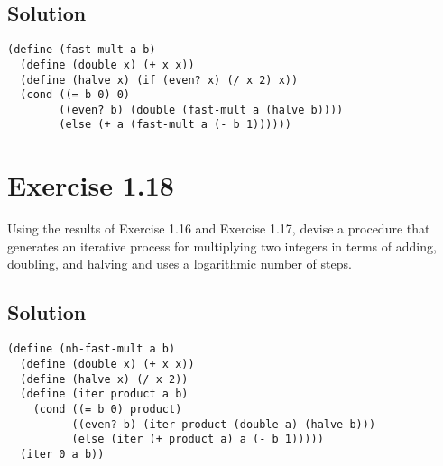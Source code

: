 \documentclass[11pt]{article}
\begin{document}
\subsection{Solution}
\label{sec:org00f66ef}
\begin{verbatim}
(define (fast-mult a b)
  (define (double x) (+ x x))
  (define (halve x) (if (even? x) (/ x 2) x))
  (cond ((= b 0) 0)
        ((even? b) (double (fast-mult a (halve b))))
        (else (+ a (fast-mult a (- b 1))))))
\end{verbatim}
\section{Exercise 1.18}
\label{sec:org6dd7235}
Using the results of Exercise 1.16 and Exercise 1.17, devise a procedure
that generates an iterative process for multiplying two integers in terms of
adding, doubling, and halving and uses a logarithmic number of steps.
\subsection{Solution}
\label{sec:orga987e05}
\begin{verbatim}
(define (nh-fast-mult a b)
  (define (double x) (+ x x))
  (define (halve x) (/ x 2))
  (define (iter product a b)
    (cond ((= b 0) product)
          ((even? b) (iter product (double a) (halve b)))
          (else (iter (+ product a) a (- b 1)))))
  (iter 0 a b))
\end{verbatim}
\end{document}
